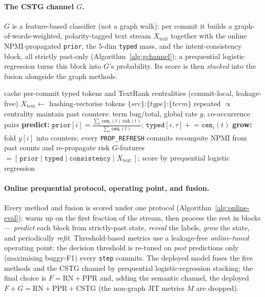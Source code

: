 \documentclass[11pt,a4paper]{article}
\newcommand{\code}[1]{\texttt{#1}}
\begin{document}
	\paragraph{The CSTG channel $G$.} $G$ is a feature-based classifier (not a
	graph walk): per commit it builds a graph-of-words-weighted, polarity-tagged text
	stream $X_{\text{text}}$ together with the online NPMI-propagated \code{prior},
	the $5$-dim \code{typed} mass, and the intent-consistency block, all strictly
	past-only (Algorithm~\ref{alg:gchannel}); a prequential logistic regression turns
	this block into $G$'s probability. Its score is then \emph{stacked} into the
	fusion alongside the graph methods.

	\begin{algorithm}[H]
	\caption{Online CSTG channel $G$ (past-only)}\label{alg:gchannel}
	\begin{algorithmic}[1]
	\State cache per-commit typed tokens and TextRank centralities (commit-local, leakage-free)
	\State $X_{\text{text}}\gets$ hashing-vectorise tokens $\{src\}\code{:}\{type\}\code{:}\{term\}$ repeated $\propto$ centrality
	\State maintain past counters: term bug/total, global rate $g$, co-occurrence pairs
	   \State \textbf{predict:} $\code{prior}[i]=\frac{\sum_t \code{cen}_i(t)\,\mathrm{risk}(t)}{\sum_t \code{cen}_i(t)}$; \; $\code{typed}[i,\tau]\mathrel{+}=\code{cen}_i(t)$
	   \State \textbf{grow:} fold $y[i]$ into counters; every \code{PROP\_REFRESH} commits recompute NPMI from past counts and re-propagate $\mathrm{risk}$
	\EndFor
	\State $G$-features $=[\,\code{prior}\mid\code{typed}\mid\code{consistency}\mid X_{\text{text}}\,]$; score by prequential logistic regression
	\end{algorithmic}
	\end{algorithm}

	\paragraph{Online prequential protocol, operating point, and fusion.} Every
	method and fusion is scored under one protocol (Algorithm~\ref{alg:online-eval}):
	warm up on the first fraction of the stream, then process the rest in blocks ---
	\emph{predict} each block from strictly-past state, \emph{reveal} the labels,
	\emph{grow} the state, and periodically \emph{refit}. Threshold-based metrics use
	a leakage-free \emph{online-tuned} operating point: the decision threshold is
	re-tuned on \emph{past} predictions only (maximising buggy-F1) every \code{step}
	commits. The deployed model fuses the five methods and the CSTG channel by
	prequential logistic-regression stacking; the final choice is $F=\text{RN}+\text{PPR}$
	and, adding the semantic channel, the deployed $F{+}G=\text{RN}+\text{PPR}+\text{CSTG}$
	(the non-graph JIT metrics $M$ are dropped).
\end{document}
